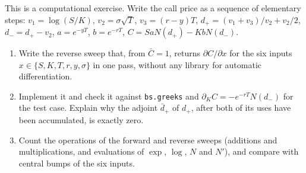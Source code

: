 \begin{exercise}\label{ex:gr-adjoint-bs}
\medium This is a computational exercise. Write the call price as a sequence of elementary
steps: $v_1=\log(S/K)$, $v_2=\sigma\sqrt T$, $v_3=(r-y)T$, $d_+=(v_1+v_3)/v_2+v_2/2$,
$d_-=d_+-v_2$, $a=e^{-yT}$, $b=e^{-rT}$, $C=SaN(d_+)-KbN(d_-)$.
\begin{enumerate}[label=(\alph*)]
  \item Write the reverse sweep that, from $\bar C=1$, returns $\partial C/\partial x$ for the
    six inputs $x\in\{S,K,T,r,y,\sigma\}$ in one pass, without any library for automatic
    differentiation.
  \item Implement it and check it against \texttt{bs.greeks} and $\partial_KC=-e^{-rT}N(d_-)$
    for the test case. Explain why the adjoint $\bar d_+$ of $d_+$, after both of its uses have
    been accumulated, is exactly zero.
  \item Count the operations of the forward and reverse sweeps (additions and multiplications,
    and evaluations of $\exp$, $\log$, $N$ and $N'$), and compare with central bumps of the six
    inputs.
\end{enumerate}
\end{exercise}
